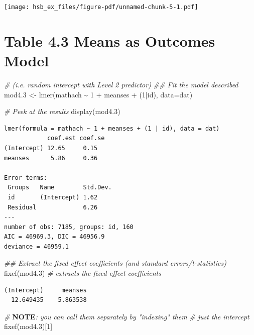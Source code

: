 \documentclass[
  letterpaper,
  DIV=11,
  numbers=noendperiod]{scrreprt}
\newenvironment{Shaded}{}{}
\newcommand{\AlertTok}[1]{\textcolor[rgb]{1.00,0.00,0.00}{\textbf{#1}}}
\newcommand{\AttributeTok}[1]{\textcolor[rgb]{0.49,0.56,0.16}{#1}}
\newcommand{\CommentTok}[1]{\textcolor[rgb]{0.38,0.63,0.69}{\textit{#1}}}
\newcommand{\DecValTok}[1]{\textcolor[rgb]{0.25,0.63,0.44}{#1}}
\newcommand{\DocumentationTok}[1]{\textcolor[rgb]{0.73,0.13,0.13}{\textit{#1}}}
\newcommand{\FloatTok}[1]{\textcolor[rgb]{0.25,0.63,0.44}{#1}}
\newcommand{\FunctionTok}[1]{\textcolor[rgb]{0.02,0.16,0.49}{#1}}
\newcommand{\NormalTok}[1]{#1}
\newcommand{\OtherTok}[1]{\textcolor[rgb]{0.00,0.44,0.13}{#1}}
\newcommand{\SpecialCharTok}[1]{\textcolor[rgb]{0.25,0.44,0.63}{#1}}
\begin{document}
\texttt{[image: hsb\_ex\_files/figure-pdf/unnamed-chunk-5-1.pdf]}

\section{Table 4.3 Means as Outcomes
Model}\label{table-4.3-means-as-outcomes-model}

\begin{Shaded}
\begin{Highlighting}[]
\CommentTok{\# (i.e. random intercept with Level 2 predictor)}
\DocumentationTok{\#\# Fit the model described }
\NormalTok{mod4}\FloatTok{.3} \OtherTok{\textless{}{-}} \FunctionTok{lmer}\NormalTok{(mathach }\SpecialCharTok{\textasciitilde{}} \DecValTok{1} \SpecialCharTok{+}\NormalTok{ meanses }\SpecialCharTok{+}\NormalTok{ (}\DecValTok{1}\SpecialCharTok{|}\NormalTok{id), }\AttributeTok{data=}\NormalTok{dat)}

\CommentTok{\# Peek at the results}
\FunctionTok{display}\NormalTok{(mod4}\FloatTok{.3}\NormalTok{)}
\end{Highlighting}
\end{Shaded}

\begin{verbatim}
lmer(formula = mathach ~ 1 + meanses + (1 | id), data = dat)
            coef.est coef.se
(Intercept) 12.65     0.15  
meanses      5.86     0.36  

Error terms:
 Groups   Name        Std.Dev.
 id       (Intercept) 1.62    
 Residual             6.26    
---
number of obs: 7185, groups: id, 160
AIC = 46969.3, DIC = 46956.9
deviance = 46959.1 
\end{verbatim}

\begin{Shaded}
\begin{Highlighting}[]
\DocumentationTok{\#\# Extract the fixed effect coefficients (and standard errors/t{-}statistics)}
\FunctionTok{fixef}\NormalTok{(mod4}\FloatTok{.3}\NormalTok{) }\CommentTok{\# extracts the fixed effect coefficients}
\end{Highlighting}
\end{Shaded}

\begin{verbatim}
(Intercept)     meanses 
  12.649435    5.863538 
\end{verbatim}

\begin{Shaded}
\begin{Highlighting}[]
\CommentTok{\# }\AlertTok{NOTE}\CommentTok{: you can call them separately by "indexing" them}
\CommentTok{\# just the intercept}
\FunctionTok{fixef}\NormalTok{(mod4}\FloatTok{.3}\NormalTok{)[}\DecValTok{1}\NormalTok{]}
\end{Highlighting}
\end{Shaded}
\end{document}
